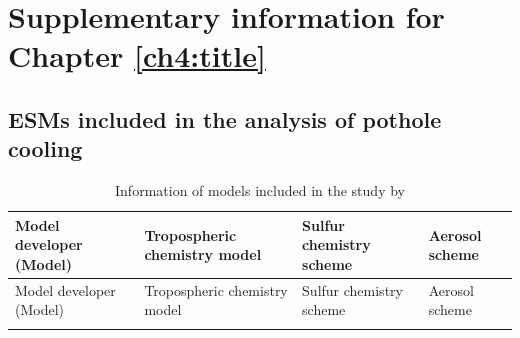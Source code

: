 \chapter{Supplementary information for Chapter \ref{ch4:title}} 
\label{app1:title}

\section{ESMs included in the analysis of pothole cooling}

\begin{small}
\begin{longtable}{>{\raggedright}p{3.25cm} >{\raggedright}p{3.25cm} >{\raggedright}p{3.5cm} >{\raggedright\arraybackslash}p{3.5cm}}
    \caption[Information of models included in the study by \citet{zhangRoleAnthropogenicAerosols2021}]{Information of models included in the study by \citet{zhangRoleAnthropogenicAerosols2021}}
    \label{tab:zhang-model}
    \\
    \toprule
     Model developer (Model) & Tropospheric chemistry model & Sulfur chemistry scheme & Aerosol scheme \\
     \midrule
     \endfirsthead

    \toprule
     Model developer (Model) & Tropospheric chemistry model & Sulfur chemistry scheme & Aerosol scheme \\
     \midrule
     \endhead
     
     \bottomrule
     \endlastfoot


\end{longtable}
\end{small}
